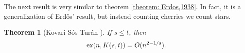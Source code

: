 \documentclass[12pt,twoside,a4paper,bibliography=totocnumbered]{book}
\numberwithin{equation}{section}
\newtheorem{theorem}             {Theorem}[section]
\newtheorem{corollary}	[theorem] {Corollary}
\theoremstyle{remark}
\def\ex{\mathop{\text{\rm ex}}\nolimits}
\begin{document}



The next result is very similar to theorem \ref{theorem: Erdos,1938}. In fact, it is a generalization of Erd\H{o}s' result, but instead counting cherries we count stars.
\begin{theorem}[{Kovari-Sós-Turán \cite{KoSoTu54}}]
If $s \leq t$, then
$$ \ex(n, K(s,t)) = O (n^{2 - 1/s}). $$
\end{theorem}
\end{document}
